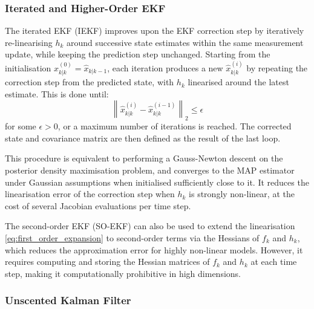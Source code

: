 \subsubsection{Iterated and Higher-Order EKF}

The iterated EKF (IEKF) \cite{bib:IEKF} improves upon the EKF correction step by iteratively re-linearising $h_k$ around successive state estimates within the same measurement update, while keeping the prediction step unchanged. Starting from the initialisation $\hat{x}_{k|k}^{(0)}=\hat{x}_{k|k-1}$, each iteration produces a new $\hat{x}_{k|k}^{(i)}$ by repeating the correction step from the predicted state, with $h_k$ linearised around the latest estimate. This is done until:
\begin{equation}
	\left\|\hat{x}_{k|k}^{(i)}-\hat{x}_{k|k}^{(i-1)}\right\|_2\leq\epsilon
\end{equation}
for some $\epsilon>0$, or a maximum number of iterations is reached. The corrected state and covariance matrix are then defined as the result of the last loop.

This procedure is equivalent to performing a Gauss-Newton descent \cite{bib:IEKF-Gauss-Newton} on the posterior density maximisation problem, and converges to the MAP estimator under Gaussian assumptions when initialised sufficiently close to it. It reduces the linearisation error of the correction step when $h_k$ is strongly non-linear, at the cost of several Jacobian evaluations per time step.

The second-order EKF (SO-EKF) \cite{bib:SO-EKF} can also be used to extend the linearisation \eqref{eq:first_order_expansion} to second-order terms via the Hessians of $f_k$ and $h_k$, which reduces the approximation error for highly non-linear models. However, it requires computing and storing the Hessian matrices of $f_k$ and $h_k$ at each time step, making it computationally prohibitive in high dimensions.

\subsubsection{Unscented Kalman Filter}

